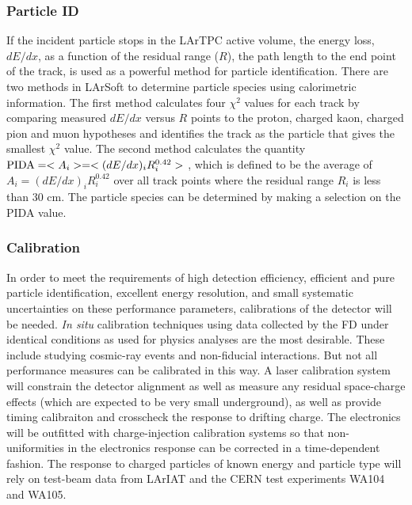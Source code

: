 \subsubsection{Particle ID}


If the incident particle stops in the LArTPC active volume, the energy
loss, $dE/dx$, as a function of the residual range ($R$), the path
length to the end point of the track, is used as a powerful method for
particle identification. There are two methods in LArSoft to determine
particle species using calorimetric information. The first method
calculates four $\chi^{2}$ values for each track by comparing measured
$dE/dx$ versus $R$ points to the proton, charged kaon, charged pion
and muon hypotheses and identifies the track as the particle that
gives the smallest $\chi^{2}$ value. The second method calculates the
quantity ${\rm{PIDA}} = <A_{i}> = <(dE/dx)_{i}R_{i}^{0.42}>$ \cite{box},
which is defined to be the average of $A_{i} =
(dE/dx)_{i}R_{i}^{0.42}$ over all track points where the residual
range $R_{i}$ is less than 30 cm. The particle species can be
determined by making a selection on the PIDA value.

\subsubsection{Calibration}

In order to meet the requirements of high detection efficiency, efficient and
pure particle identification, excellent energy resolution, and small systematic
uncertainties on these performance parameters, calibrations of the detector
will be needed.  {\it In situ} calibration techniques using data collected by the FD
under identical conditions as used for physics analyses are the most desirable.
These include studying cosmic-ray events and non-fiducial interactions.  But not
all performance measures can be calibrated in this way.  A laser calibration system
will constrain the detector alignment as well as measure any residual space-charge effects
(which are expected to be very small underground), as well as provide timing calibraiton
and crosscheck the response to drifting charge.  The electronics will be outfitted with
charge-injection calibration systems so that non-uniformities in the electronics response
can be corrected in a time-dependent fashion.  The response to charged particles of known
energy and particle type will rely on test-beam data from LArIAT and the CERN test
experiments WA104 and WA105.


